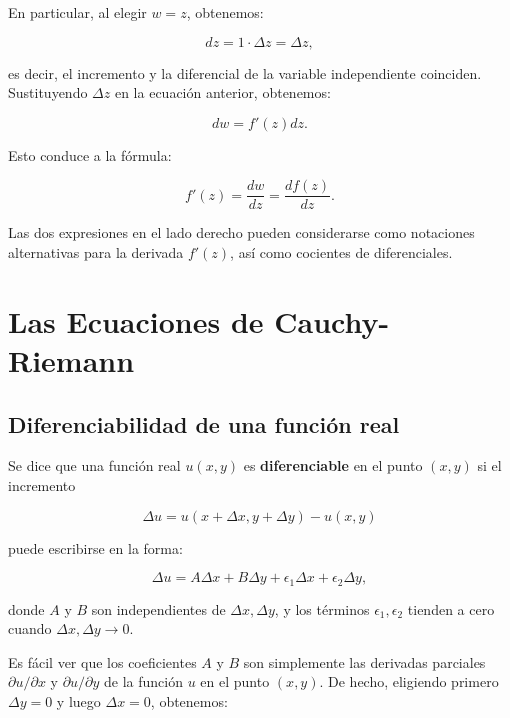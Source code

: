 \documentclass[10pt,a4paper]{book}
\begin{document}
En particular, al elegir $ w = z $, obtenemos:

\begin{equation}
    dz = 1 \cdot \Delta z = \Delta z,
\end{equation}

es decir, el incremento y la diferencial de la variable independiente coinciden. Sustituyendo $ \Delta z $ en la ecuaci\'on anterior, obtenemos:

\begin{equation}
    dw = f'(z) dz.
\end{equation}

Esto conduce a la f\'ormula:

\begin{equation}
    f'(z) = \frac{dw}{dz} = \frac{df(z)}{dz}.
\end{equation}

Las dos expresiones en el lado derecho pueden considerarse como notaciones alternativas para la derivada $ f'(z) $, as\'i como cocientes de diferenciales.
\newpage
\section{Las Ecuaciones de Cauchy-Riemann}

\subsection{Diferenciabilidad de una funci\'on real}

Se dice que una funci\'on real $ u(x, y) $ es \textbf{diferenciable} en el punto $ (x, y) $ si el incremento  

\begin{equation}
    \Delta u = u(x + \Delta x, y + \Delta y) - u(x, y)
\end{equation}

puede escribirse en la forma:

\begin{equation}
    \Delta u = A \Delta x + B \Delta y + \epsilon_1 \Delta x + \epsilon_2 \Delta y,
\end{equation}

donde $ A $ y $ B $ son independientes de $ \Delta x, \Delta y $, y los t\'erminos $ \epsilon_1, \epsilon_2 $ tienden a cero cuando $ \Delta x, \Delta y \to 0 $.  

Es f\'acil ver que los coeficientes $ A $ y $ B $ son simplemente las derivadas parciales $ \partial u / \partial x $ y $ \partial u / \partial y $ de la funci\'on $ u $ en el punto $ (x, y) $. De hecho, eligiendo primero $ \Delta y = 0 $ y luego $ \Delta x = 0 $, obtenemos:
\end{document}
